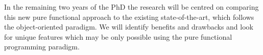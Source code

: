 \documentclass[oneside]{book}
\begin{document}
In the remaining two years of the PhD the research will be centred on comparing this new pure functional approach to the existing state-of-the-art, which follows the object-oriented paradigm. We will identify benefits and drawbacks and look for unique features which may be only possible using the pure functional programming paradigm.

\clearpage
\tableofcontents
\clearpage















\renewcommand\bibname{References}





\end{document}
